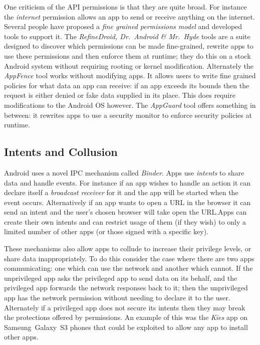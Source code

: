 \documentclass[a4paper]{article}
\begin{document}
One criticism of the API permissions is that they are quite broad. For instance
the \emph{internet} permission allows an app to send or receive anything on the
internet. Several people have proposed a \emph{fine grained permissions model}
and developed tools to support it. The \emph{RefineDroid, Dr.~Android \&
  Mr.~Hyde} tools\cite{Jeon:2012ki} are a suite designed to discover which
permissions can be made fine-grained, rewrite apps to use these permissions and
then enforce them at runtime; they do this on a stock Android system without
requiring rooting or kernel modification. Alternately the \emph{AppFence}
tool\cite{Hornyack:2011wq} works without modifying apps. It allows users to
write fine grained policies for what data an app can receive: if an app exceeds
its bounds then the request is either denied or fake data supplied in its place.
This does require modifications to the Android OS however. The \emph{AppGuard}
tool\cite{Backes:2013ec} offers something in between: it rewrites apps to use a
security monitor to enforce security policies at runtime.


\subsection{Intents and Collusion}

Android uses a novel IPC mechanism called \emph{Binder}. Apps use
\emph{intents} to share data and handle events. For instance if an app wishes
to handle an  action it can declare itself a \emph{broadcast
  receiver} for it and the app will be started when the event occurs.
Alternatively if an app wants to open a URL in the browser it can send an
 intent and the user's chosen browser will take open the
URL.\@ Apps can create their own intents and can restrict usage of them (if they
wish) to only a limited number of other apps (or those signed with a specific
key).

These mechanisms also allow apps to collude to increase their privilege levels,
or share data inappropriately. To do this consider the case where there are two
apps communicating: one which can use the network and another which cannot. If
the unprivileged app asks the privileged app to send data on its behalf, and the
privileged app forwards the network responses back to it; then the unprivileged
app has the network permission without needing to declare it to the user.
Alternately if a privileged app does not secure its intents then they may break
the protections offered by permissions. An example of this was the \emph{Kies}
app on Samsung~Galaxy~S3 phones that could be exploited to allow any app to
install other apps\cite{moulu:8btkPowj}.
\end{document}
